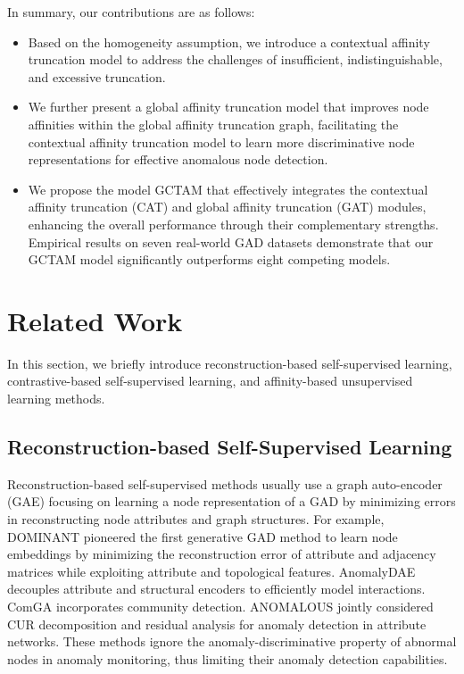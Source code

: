 \documentclass{article}
\begin{document}
In summary, our contributions are as follows:
\begin{itemize}
    \item Based on the homogeneity assumption, we introduce a contextual affinity truncation model to address the challenges of insufficient, indistinguishable, and excessive truncation.
    
    \item We further present a global affinity truncation model that improves node affinities within the global affinity truncation graph, facilitating the contextual affinity truncation model to learn more discriminative node representations for effective anomalous node detection.

    \item We propose the model GCTAM that effectively integrates the contextual affinity truncation (CAT) and global affinity truncation (GAT) modules, enhancing the overall performance through their complementary strengths. Empirical results on seven real-world GAD datasets demonstrate that our GCTAM model significantly outperforms eight competing models.
\end{itemize}









\section{Related Work}
In this section, we briefly introduce reconstruction-based self-supervised learning, contrastive-based self-supervised learning, and affinity-based unsupervised learning methods.  

\subsection{Reconstruction-based Self-Supervised Learning}
Reconstruction-based self-supervised methods usually use a graph auto-encoder (GAE) focusing on learning a node representation of a GAD by minimizing errors in reconstructing node attributes and graph structures. For example, DOMINANT\cite{dominant_ding2019deep} pioneered the first generative GAD method to learn node embeddings by minimizing the reconstruction error of attribute and adjacency matrices while exploiting attribute and topological features. AnomalyDAE\cite{dae_fan2020anomalydae} decouples attribute and structural encoders to efficiently model interactions. ComGA \cite{ComGA_luo2022comga} incorporates community detection. ANOMALOUS \cite{ANOMALOUS_peng2018anomalous} jointly considered CUR decomposition and residual analysis for anomaly detection in attribute networks. These methods ignore the anomaly-discriminative property of abnormal nodes in anomaly monitoring, thus limiting their anomaly detection capabilities.
\end{document}

